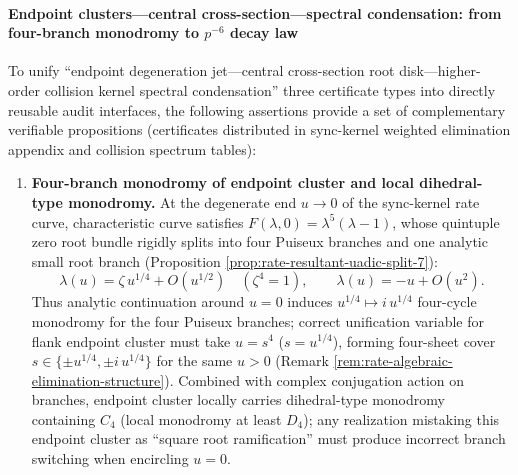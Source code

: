 \paragraph{Endpoint clusters---central cross-section---spectral condensation: from four-branch monodromy to \texorpdfstring{$p^{-6}$}{p^-6} decay law}
To unify ``endpoint degeneration jet---central cross-section root disk---higher-order collision kernel spectral condensation'' three certificate types into directly reusable audit interfaces, the following assertions provide a set of complementary verifiable propositions (certificates distributed in sync-kernel weighted elimination appendix and collision spectrum tables):
\begin{enumerate}
  \item \textbf{Four-branch monodromy of endpoint cluster and local dihedral-type monodromy.}
  At the degenerate end \(u\to 0\) of the sync-kernel rate curve, characteristic curve satisfies \(F(\lambda,0)=\lambda^5(\lambda-1)\), whose quintuple zero root bundle rigidly splits into four Puiseux branches and one analytic small root branch (Proposition \ref{prop:rate-resultant-uadic-split-7}):
  \[
  \lambda(u)=\zeta\,u^{1/4}+O(u^{1/2})\quad(\zeta^4=1),
  \qquad
  \lambda(u)=-u+O(u^2).
  \]
  Thus analytic continuation around \(u=0\) induces \(u^{1/4}\mapsto i\,u^{1/4}\) four-cycle monodromy for the four Puiseux branches; correct unification variable for flank endpoint cluster must take \(u=s^4\) (\(s=u^{1/4}\)), forming four-sheet cover \(s\in\{\pm u^{1/4},\pm i\,u^{1/4}\}\) for the same \(u>0\) (Remark \ref{rem:rate-algebraic-elimination-structure}).
  Combined with complex conjugation action on branches, endpoint cluster locally carries dihedral-type monodromy containing \(C_4\) (local monodromy at least \(D_4\)); any realization mistaking this endpoint cluster as ``square root ramification'' must produce incorrect branch switching when encircling \(u=0\).


\end{enumerate}
